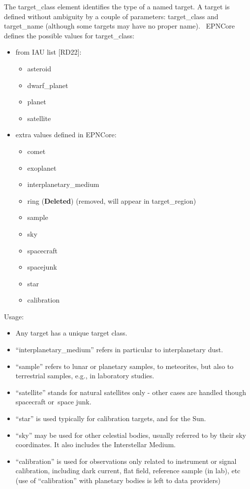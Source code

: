 \documentclass[11pt,a4paper]{ivoa}
\begin{document}
The target\_class element identifies the type of a named target. A target is defined without ambiguity by a couple of parameters: target\_class and target\_name (although some targets may have no proper name).  EPNCore defines the possible values for target\_class:

\begin{itemize}
\item from IAU list [RD22]:\begin{itemize}
\item asteroid
\item dwarf\_planet
\item planet
\item satellite
\end{itemize}


\item extra values defined in EPNCore:\begin{itemize}
\item comet
\item exoplanet
\item interplanetary\_medium
\item ring (\textbf{Deleted}) (removed, will appear in target\_region)
\item sample
\item sky
\item spacecraft
\item spacejunk
\item star
\item calibration
\end{itemize}


\end{itemize}

Usage:

\begin{itemize}
\item Any target has a unique target class.
\item ``interplanetary\_medium'' refers in particular to interplanetary dust.
\item ``sample'' refers to lunar or planetary samples, to meteorites, but also to terrestrial samples, e.g., in laboratory studies.
\item ``satellite'' stands for natural satellites only - other cases are handled though spacecraft or space junk.
\item ``star'' is used typically for calibration targets, and for the Sun.
\item ``sky'' may be used for other celestial bodies, usually referred to by their sky coordinates. It also includes the Interstellar Medium.
\item ``calibration'' is used for observations only related to instrument or signal calibration, including dark current, flat field, reference sample (in lab), etc (use of ``calibration'' with planetary bodies is left to data providers)
\end{itemize}
\end{document}
